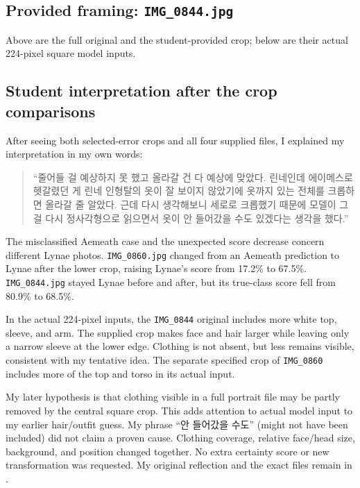 \documentclass[11pt]{article}
\begin{document}
\clearpage
\subsection*{Provided framing: \texttt{IMG\_0844.jpg}}
\par\noindent\begin{minipage}{\linewidth}
Above are the full original and the student-provided crop; below are their actual 224-pixel square model inputs.
\end{minipage}\par\medskip

\clearpage
\subsection*{Student interpretation after the crop comparisons}
\label{p7:student_crop_reflection}
After seeing both selected-error crops and all four supplied files, I explained my interpretation in my own words:
\begin{quote}
``줄어들 걸 예상하지 못 했고 올라갈 건 다 예상에 맞았다. 린네인데 에이메스로 헷갈렸던 게 린네 인형탈의 옷이 잘 보이지 않았기에 옷까지 있는 전체를 크롭하면 올라갈 줄 알았다. 근데 다시 생각해보니 세로로 크롭했기 때문에 모델이 그걸 다시 정사각형으로 읽으면서 옷이 안 들어갔을 수도 있겠다는 생각을 했다.''
\end{quote}

The misclassified Aemeath case and the unexpected score decrease concern different Lynae photos. \texttt{IMG\_0860.jpg} changed from an Aemeath prediction to Lynae after the lower crop, raising Lynae's score from 17.2\% to 67.5\%. \texttt{IMG\_0844.jpg} stayed Lynae before and after, but its true-class score fell from 80.9\% to 68.5\%.

In the actual 224-pixel inputs, the \texttt{IMG\_0844} original includes more white top, sleeve, and arm. The supplied crop makes face and hair larger while leaving only a narrow sleeve at the lower edge. Clothing is not absent, but less remains visible, consistent with my tentative idea. The separate specified crop of \texttt{IMG\_0860} includes more of the top and torso in its actual input.

My later hypothesis is that clothing visible in a full portrait file may be partly removed by the central square crop. This adds attention to actual model input to my earlier hair/outfit guess. My phrase ``안 들어갔을 수도'' (might not have been included) did not claim a proven cause. Clothing coverage, relative face/head size, background, and position changed together. No extra certainty score or new transformation was requested. My original reflection and the exact files remain in .
\end{document}
